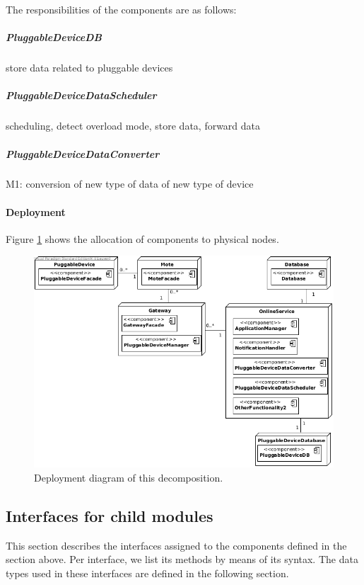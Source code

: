         \noindent The responsibilities of the components are as follows:

    \subparagraph{PluggableDeviceDB}
        store data related to pluggable devices

    \subparagraph{PluggableDeviceDataScheduler}
        scheduling, detect overload mode, store data, forward data

    \subparagraph{PluggableDeviceDataConverter}
        M1: conversion of new type of data of new type of device


    \paragraph{Deployment}
        Figure \ref{fig:it2-depl_main} shows the allocation of components
        to physical nodes.

        \begin{figure}[!h]
        	\centering
        	\includegraphics[width=1\textwidth]{deployment-diagram-2}
        	\caption{Deployment diagram of this decomposition.
        	}\label{fig:it2-depl_main}
        \end{figure}


\subsection{Interfaces for child modules}\label{add2-interfaces}
    This section describes the interfaces assigned to the components defined
    in the section above. Per interface, we list its methods by means of its
    syntax. The data types used in these interfaces are defined in the following section. \\

